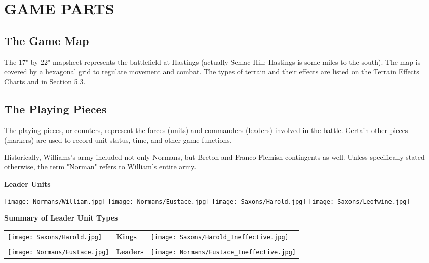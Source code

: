 \section{GAME PARTS}

\subsection{The Game Map}

The 17" by 22" mapsheet represents the battlefield at Hastings (actually Senlac Hill; Hastings is some miles to the south). The map is covered by a hexagonal grid to regulate movement and combat. The types of terrain and their effects are listed on the Terrain Effects Charts and in Section 5.3.

\subsection{The Playing Pieces}

The playing pieces, or counters, represent the forces (units) and commanders (leaders) involved in the battle. Certain other pieces (markers) are used to record unit status, time, and other game functions.

Historically, Williams's army included not only Normans, but Breton and Franco-Flemish contingents as well. Unless specifically stated otherwise, the term "Norman" refers to William's entire army.

\begin{center}
\textbf{Leader Units}
\end{center}
\par
\hspace{1em}
\texttt{[image: Normans/William.jpg]}
\hspace{1em}
\texttt{[image: Normans/Eustace.jpg]}
\hspace{1em}
\texttt{[image: Saxons/Harold.jpg]}
\hspace{1em}
\texttt{[image: Saxons/Leofwine.jpg]}

\par
\begin{center}
  \textbf{Summary of Leader Unit Types}
  \break
\end{center}

\renewcommand\tabularxcolumn[1]{m{#1}}

\begin{tabularx}{0.5\textwidth}{
    >{\raggedright\arraybackslash}X
    >{\centering\arraybackslash}X
    >{\raggedleft\arraybackslash}X}
    \texttt{[image: Saxons/Harold.jpg]} &
    \textbf{Kings} &
    \texttt{[image: Saxons/Harold\_Ineffective.jpg]} \\ \\
    \texttt{[image: Normans/Eustace.jpg]} &
    \textbf{Leaders} &
    \texttt{[image: Normans/Eustace\_Ineffective.jpg]}
\end{tabularx}


